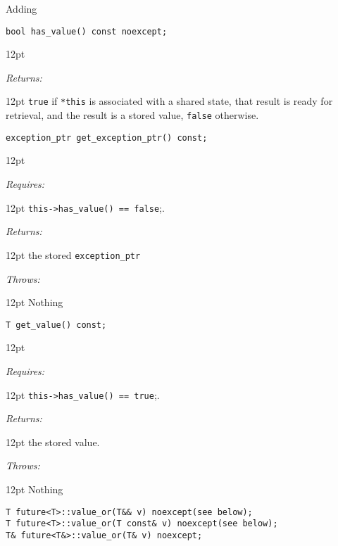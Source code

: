 \documentclass[a4paper,10pt]{article}
\newcommand{\cpp}[1]{\lstinline{#1}}
\newcommand{\wordingItem}[1]{\noindent\textit{#1:}}
\newenvironment{wordingPara}{\begin{adjustwidth}{12pt}{}}{\end{adjustwidth}}
\newenvironment{Throws}{\wordingItem{Throws}\vspace{7pt}\noindent\begin{adjustwidth}{12pt}{}}{\vspace{7pt}\end{adjustwidth}}
\newenvironment{Returns}{\wordingItem{Returns}\vspace{7pt}\noindent\begin{adjustwidth}{12pt}{}}{\vspace{7pt}\end{adjustwidth}}
\newenvironment{Requires}{\wordingItem{Requires}\vspace{7pt}\noindent\begin{adjustwidth}{12pt}{}}{\vspace{7pt}\end{adjustwidth}}
\begin{document}
\noindent
Adding

\begin{lstlisting}[xleftmargin=0pt]
bool has_value() const noexcept;
\end{lstlisting}

\begin{wordingPara}

\begin{Returns} \cpp{true} if \cpp{*this} is associated with a shared state, that result is ready for retrieval, and the result is a stored value, \cpp{false} otherwise.
\end{Returns}

\end{wordingPara}
\begin{lstlisting}[xleftmargin=0pt]
exception_ptr get_exception_ptr() const;
\end{lstlisting}
\begin{wordingPara}

\begin{Requires}
\cpp{this->has_value() == false};.
\end{Requires}

\begin{Returns}
the stored \cpp{exception_ptr} 
\end{Returns}

\begin{Throws}
Nothing 
\end{Throws}

\end{wordingPara}
\begin{lstlisting}[xleftmargin=0pt]
T get_value() const;
\end{lstlisting}
\begin{wordingPara}

\begin{Requires}
\cpp{this->has_value() == true};.
\end{Requires}

\begin{Returns}
the stored value. 
\end{Returns}

\begin{Throws}
Nothing 
\end{Throws}

\end{wordingPara}
\begin{lstlisting}[xleftmargin=0pt]
T future<T>::value_or(T&& v) noexcept(see below);
T future<T>::value_or(T const& v) noexcept(see below);
T& future<T&>::value_or(T& v) noexcept;
\end{lstlisting}
\end{document}
